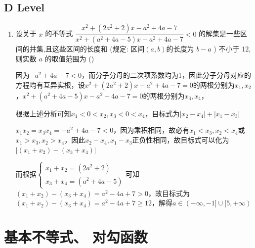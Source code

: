 \subsection*{D Level}
\begin{enumerate}
    \item 设关于 $x$ 的不等式 $\dfrac{{x}^{2} + \left( {2{a}^{2} + 2}\right) x - {a}^{2} + {4a} - 7}{{x}^{2} + \left( {{a}^{2} + {4a} - 5}\right) x - {a}^{2} + {4a} - 7} < 0$ 的解集是一些区间的并集,且这些区间的长度和 (规定: 区间$(a, b)$的长度为 $b - a$ ) 不小于 12,则实数 $a$ 的取值范围为 \dotfill()
    \begin{jieda}
        因为$- {a}^{2} + {4a} - 7 < 0$，而分子分母的二次项系数均为1，因此分子分母对应的方程均有互异实根，设${x}^{2} + \left( {2{a}^{2} + 2}\right) x - {a}^{2} + {4a} - 7 = 0$的两根分别为$x_1, x_2$，${x}^{2} + \left( {{a}^{2} + {4a} - 5}\right) x - {a}^{2} + {4a} - 7 = 0$的两根分别为$x_3, x_4$，
        
        根据上述分析可知$x_1 < 0 < x_2, x_3 < 0 < x_4$，目标式为$|x_2-x_4| + |x_1-x_3|$

        $x_1 x_2 = x_3x_4 = - {a}^{2} + {4a} - 7 < 0$，因为乘积相同，故必有$x_1 < x_3, x_2 < x_4$或$x_1 > x_3, x_2 > x_4$，因此$x_2-x_4,x_1-x_3$正负性相同，故目标式可以化为$|(x_1+x_2)-(x_3+x_4)|$
        
        而根据$\left\{\begin{array}{l}
             x_1 + x_2 = \left( 2{a}^{2} + 2\right)  \\
             x_3 + x_4 = \left( {{a}^{2} + {4a} - 5}\right)
        \end{array}\right.$可知$(x_1+x_2) - (x_3+x_4) = a^2-4a+7 > 0$，故目标式为$(x_1+x_2)-(x_3+x_4) = a^2-4a+7 \geq 12$，解得$a \in (-\infty, -1] \cup [5, +\infty)$

    \end{jieda}
\end{enumerate}
\section*{基本不等式、 对勾函数}
